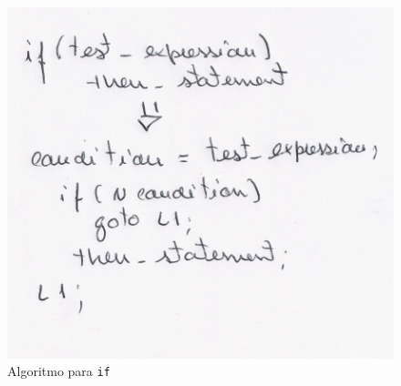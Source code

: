 \begin{figure}[<+htpb+>]
	\centering
	\includegraphics[scale=0.75]{./report/img/if.png}
	\caption{Algoritmo para \texttt{if}}
\label{fig:figure1}
\end{figure}
